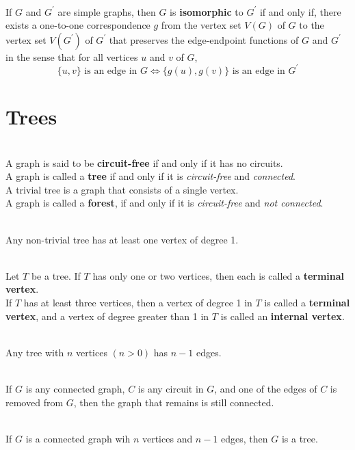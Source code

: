 \documentclass[12pt]{article}
\begin{document}
\begin{definition}
\hfill\\
\normalfont If $G$ and $G^\prime$ are simple graphs, then $G$ is \textbf{isomorphic} to $G^\prime$ if and only if, there exists a one-to-one correspondence $g$ from the vertex set $V(G)$ of $G$ to the vertex set $V(G^\prime)$ of $G^\prime$ that preserves the edge-endpoint functions of $G$ and $G^\prime$ in the sense that for all vertices $u$ and $v$ of $G$,
\[
\{u,v\}\text{ is an edge in }G\Leftrightarrow\{g(u),g(v)\}\text{ is an edge in }G^\prime 
\]
\end{definition}
\clearpage
\section{Trees}
\begin{definition}[Tree]
\hfill\\
\normalfont A graph is said to be \textbf{circuit-free} if and only if it has no circuits.\\
A graph is called a \textbf{tree} if and only if it is \textit{circuit-free} and \textit{connected}.\\
A trivial tree is a graph that consists of a single vertex.\\
A graph is called a \textbf{forest}, if and only if it is \textit{circuit-free} and \textit{not connected}.
\end{definition}
\begin{lemma}[10.5.1]
\hfill\\
\normalfont Any non-trivial tree has at least one vertex of degree 1.
\end{lemma}
\begin{definition}
\hfill\\
\normalfont Let $T$ be a tree. If $T$ has only one or two vertices, then each is called a \textbf{terminal vertex}. \\
If $T$ has at least three vertices, then a vertex of degree 1 in $T$ is called a \textbf{terminal vertex}, and a vertex of degree greater than 1 in $T$ is called an \textbf{internal vertex}.
\end{definition}
\begin{theorem}[10.5.2]
\hfill\\
\normalfont Any tree with $n$ vertices $(n>0)$ has $n-1$ edges.
\end{theorem}
\begin{lemma}[10.5.3]
\hfill\\
\normalfont If $G$ is any connected graph, $C$ is any circuit in $G$, and one of the edges of $C$ is removed from $G$, then the graph that remains is still connected.
\end{lemma}
\begin{theorem}[10.5.4]
\hfill\\
\normalfont If $G$ is a connected graph wih $n$ vertices and $n-1$ edges, then $G$ is a tree.
\end{theorem}
\end{document}
